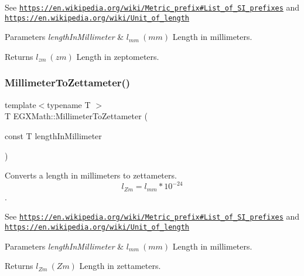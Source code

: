 See \href{https://en.wikipedia.org/wiki/Metric_prefix#List_of_SI_prefixes}{\tt https\+://en.\+wikipedia.\+org/wiki/\+Metric\+\_\+prefix\#\+List\+\_\+of\+\_\+\+S\+I\+\_\+prefixes} and \href{https://en.wikipedia.org/wiki/Unit_of_length}{\tt https\+://en.\+wikipedia.\+org/wiki/\+Unit\+\_\+of\+\_\+length} 
\begin{DoxyParams}{Parameters}
{\em length\+In\+Millimeter} & $ l_{mm}\ (mm)$ Length in millimeters. \\
\hline
\end{DoxyParams}
\begin{DoxyReturn}{Returns}
$ l_{zm}\ (zm)$ Length in zeptometers. 
\end{DoxyReturn}
\mbox{\label{group___e_g_x_math-_conversions-_length_conversions-_millimeter-_s_i_ga06531acdd75d87de598010df5c9536f5}} 
\subsubsection{\texorpdfstring{Millimeter\+To\+Zettameter()}{MillimeterToZettameter()}}
{\footnotesize\ttfamily template$<$typename T $>$ \\
T E\+G\+X\+Math\+::\+Millimeter\+To\+Zettameter (\begin{DoxyParamCaption}\item[{const T}]{length\+In\+Millimeter }\end{DoxyParamCaption})}



Converts a length in millimeters to zettameters. \[ l_{Zm}=l_{mm} * 10^{-24} \]. 

See \href{https://en.wikipedia.org/wiki/Metric_prefix#List_of_SI_prefixes}{\tt https\+://en.\+wikipedia.\+org/wiki/\+Metric\+\_\+prefix\#\+List\+\_\+of\+\_\+\+S\+I\+\_\+prefixes} and \href{https://en.wikipedia.org/wiki/Unit_of_length}{\tt https\+://en.\+wikipedia.\+org/wiki/\+Unit\+\_\+of\+\_\+length} 
\begin{DoxyParams}{Parameters}
{\em length\+In\+Millimeter} & $ l_{mm}\ (mm)$ Length in millimeters. \\
\hline
\end{DoxyParams}
\begin{DoxyReturn}{Returns}
$ l_{Zm}\ (Zm)$ Length in zettameters. 
\end{DoxyReturn}
